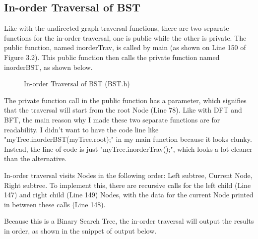 \documentclass[letterpaper, 10pt]{article}
\begin{document}
\subsection{In-order Traversal of BST}
\noindent
Like with the undirected graph traversal functions, there are two separate functions for the in-order traversal, one is public while the other is private. The public function, named inorderTrav, is called by main (as shown on Line 150 of Figure 3.2). This public function then calls the private function named inorderBST, as shown below. 

\begin{figure}[H]
  \centering
   
  \label{fig:figure3.8-part1}
\end{figure}

\vspace{-3em}

\begin{figure}[H]
  \centering
   
  \caption{In-order Traversal of BST (BST.h)}
  \label{fig:figure3.8-part2}
\end{figure}

\noindent
The private function call in the public function has a parameter, which signifies that the traversal will start from the root Node (Line 78). Like with DFT and BFT, the main reason why I made these two separate functions are for readability. I didn't want to have the code line like "myTree.inorderBST(myTree.root);" in my main function because it looks clunky. Instead, the line of code is just "myTree.inorderTrav();", which looks a lot cleaner than the alternative.

\vspace{1em}
\noindent
In-order traversal visits Nodes in the following order: Left subtree, Current Node, Right subtree. To implement this, there are recursive calls for the left child (Line 147) and right child (Line 149) Nodes, with the data for the current Node printed in between these calls (Line 148). 

\vspace{1em}
\noindent
Because this is a Binary Search Tree, the in-order traversal will output the results in order, as shown in the snippet of output below.
\end{document}

